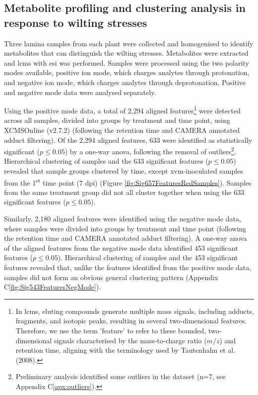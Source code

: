 \subsection{Metabolite profiling and clustering analysis in response to wilting stresses}

Three lamina samples from each plant were collected and homogenised to identify metabolites that can distinguish the wilting stresses. Metabolites were extracted and \ac{lcms} with \ac{esi} was performed. Samples were processed using the two polarity modes available, positive ion mode, which charges analytes through protonation, and negative ion mode, which charges analytes through deprotonation. Positive and negative mode data were analysed separately. 

Using the positive mode data, a total of 2,294 aligned features\footnote{In \ac{lcms}, eluting compounds generate multiple mass signals, including adducts, fragments, and isotopic peaks, resulting in several two-dimensional features. Therefore, we use the term 'feature' to refer to these bounded, two-dimensional signals characterised by the mass-to-charge ratio ($m/z$) and retention time, aligning with the terminology used by Tautenhahn et al. (2008).} were detected across all samples, divided into groups by treatment and time point, using XCMSOnline (v2.7.2) \parencite{Gowda2014} (following the retention time and CAMERA annotated adduct filtering). Of the 2,294 aligned features, 633 were identified as statistically significant ($p \le0.05$) by a one-way \ac{anova}, following the removal of outliers\footnote{Preliminary analysis identified some outliers in the dataset (n=7, see Appendix C\ref{apx:outliers}).}. Hierarchical clustering of samples and the 633 significant features ($p \le0.05$) revealed that sample groups clustered by time, except \ac{xvm}-inoculated samples from the 1\textsuperscript{st} time point (7 \ac{dpi}) (Figure \ref{fig:Sig657FeaturesRedSamples}). Samples from the same treatment group did not all cluster together when using the 633 significant features ($p \le0.05$).

Similarly, 2,180 aligned features were identified using the negative mode data, where samples were divided into groups by treatment and time point (following the retention time and CAMERA annotated adduct filtering). A one-way \ac{anova} of 
the aligned features from the negative mode data identified 453 significant features ($p \le0.05$). Hierarchical clustering of samples and the 453 significant features revealed that, unlike the features identified from the positive mode data, samples did not form an obvious general clustering pattern (Appendix C\ref{fig:Sig543FeaturesNegMode}).

